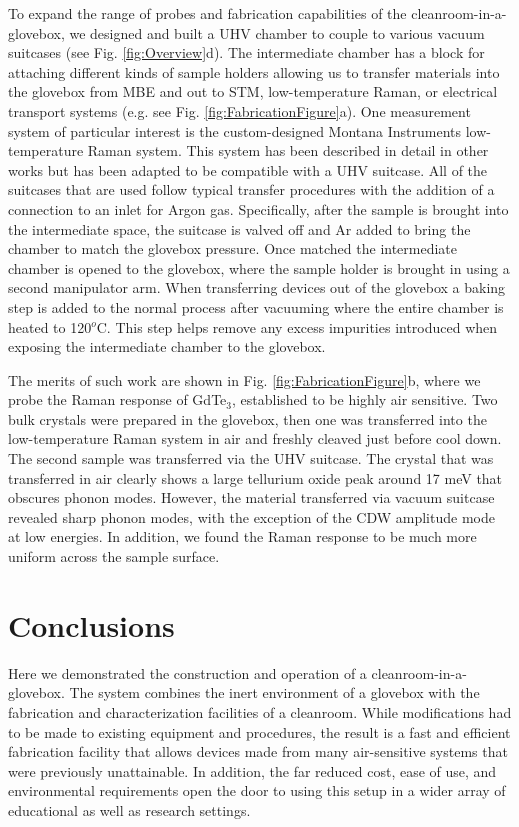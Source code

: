 To expand the range of probes and fabrication capabilities of the cleanroom-in-a-glovebox, we designed and built a UHV chamber to couple to various vacuum suitcases (see Fig. \ref{fig:Overview}d). The intermediate chamber has a block for attaching different kinds of sample holders allowing us to transfer materials into the glovebox from MBE and out to STM, low-temperature Raman, or electrical transport systems (e.g. see Fig. \ref{fig:FabricationFigure}a). One measurement system of particular interest is the custom-designed Montana Instruments low-temperature Raman system. This system has been described in detail in other works\cite{Tian2016} but has been adapted to be compatible with a UHV suitcase. All of the suitcases that are used follow typical transfer procedures with the addition of a connection to an inlet for Argon gas. Specifically, after the sample is brought into the intermediate space, the suitcase is valved off and Ar added to bring the chamber to match the glovebox pressure. Once matched the intermediate chamber is opened to the glovebox, where the sample holder is brought in using a second manipulator arm. When transferring devices out of the glovebox a baking step is added to the normal process after vacuuming where the entire chamber is heated to 120$^{o}$C. This step helps remove any excess impurities introduced when exposing the intermediate chamber to the glovebox.

The merits of such work are shown in Fig. \ref{fig:FabricationFigure}b, where we probe the Raman response of GdTe$_{3}$, established to be highly air sensitive.\cite{lei2019high} Two bulk crystals were prepared in the glovebox, then one was transferred into the low-temperature Raman system in air and freshly cleaved just before cool down. The second sample was transferred via the UHV suitcase. The crystal that was transferred in air clearly shows a large tellurium oxide peak around 17 meV that obscures phonon modes.\cite{YaoCGT2Dmat,lei2019high} However, the material transferred via vacuum suitcase revealed sharp phonon modes, with the exception of the CDW amplitude mode at low energies. In addition, we found the Raman response to be much more uniform across the sample surface. 

\section{Conclusions}
Here we demonstrated the construction and operation of a cleanroom-in-a-glovebox. The system combines the inert environment of a glovebox with the fabrication and characterization facilities of a cleanroom. While modifications had to be made to existing equipment and procedures, the result is a fast and efficient fabrication facility that allows devices made from many air-sensitive systems that were previously unattainable. In addition, the far reduced cost, ease of use, and environmental requirements open the door to using this setup in a wider array of educational as well as research settings. 